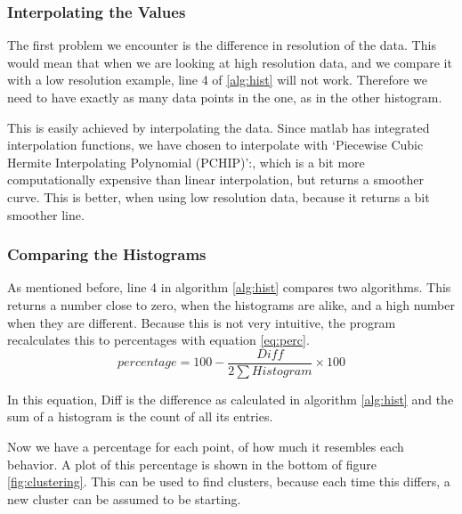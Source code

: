 

\subsubsection{Interpolating the Values}
The first problem we encounter is the difference in resolution of the data. This
would mean that when we are looking at high resolution data, and we compare it
with a low resolution example, line 4 of \ref{alg:hist} will not work. Therefore
we need to have exactly as many data points in the one, as in the other
histogram. 

This is easily achieved by interpolating the data. Since matlab has integrated
interpolation functions, we have chosen to interpolate with `Piecewise Cubic
Hermite Interpolating Polynomial (PCHIP)':, which is a bit more computationally
expensive than linear interpolation, but returns a smoother curve. This is
better, when using low resolution data, because it returns a bit smoother line.

\subsubsection{Comparing the Histograms}
As mentioned before, line 4 in algorithm \ref{alg:hist} compares two algorithms.
This returns a number close to zero, when the histograms are alike, and a high
number when they are different. Because this is not very intuitive, the program
recalculates this to percentages with equation \ref{eq:perc}.
\begin{equation}
\label{eq:perc}
percentage = 100 - \frac{Diff}{2 \sum Histogram} \times 100
\end{equation}

In this equation, Diff is the difference as calculated in algorithm
\ref{alg:hist} and the sum of a histogram is the count of all its entries. 

Now we have a percentage for each point, of how much it resembles each behavior.
A plot of this percentage is shown in the bottom of figure \ref{fig:clustering}.
This can be used to find clusters, because each time this differs, a new
cluster can be assumed to be starting.

